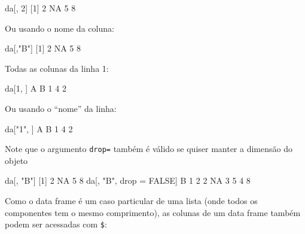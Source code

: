 \documentclass[
  10pt,
  a4paper]{book}
\newenvironment{Shaded}{\begin{snugshade}}{\end{snugshade}}
\newcommand{\ConstantTok}[1]{\textcolor[rgb]{0.00,0.00,0.00}{#1}}
\newcommand{\DecValTok}[1]{\textcolor[rgb]{0.00,0.00,0.81}{#1}}
\newcommand{\NormalTok}[1]{#1}
\newcommand{\OtherTok}[1]{\textcolor[rgb]{0.56,0.35,0.01}{#1}}
\newcommand{\StringTok}[1]{\textcolor[rgb]{0.31,0.60,0.02}{#1}}
\begin{document}
\begin{Shaded}
\begin{Highlighting}[]
\NormalTok{da[, }\DecValTok{2}\NormalTok{]}
\NormalTok{[}\DecValTok{1}\NormalTok{]  }\DecValTok{2} \ConstantTok{NA}  \DecValTok{5}  \DecValTok{8}
\end{Highlighting}
\end{Shaded}

Ou usando o nome da coluna:

\begin{Shaded}
\begin{Highlighting}[]
\NormalTok{da[,}\StringTok{"B"}\NormalTok{]}
\NormalTok{[}\DecValTok{1}\NormalTok{]  }\DecValTok{2} \ConstantTok{NA}  \DecValTok{5}  \DecValTok{8}
\end{Highlighting}
\end{Shaded}

Todas as colunas da linha 1:

\begin{Shaded}
\begin{Highlighting}[]
\NormalTok{da[}\DecValTok{1}\NormalTok{, ]}
\NormalTok{  A B}
\DecValTok{1} \DecValTok{4} \DecValTok{2}
\end{Highlighting}
\end{Shaded}

Ou usando o ``nome'' da linha:

\begin{Shaded}
\begin{Highlighting}[]
\NormalTok{da[}\StringTok{"1"}\NormalTok{, ]}
\NormalTok{  A B}
\DecValTok{1} \DecValTok{4} \DecValTok{2}
\end{Highlighting}
\end{Shaded}

Note que o argumento \texttt{drop=} também é válido se quiser manter a dimensão
do objeto

\begin{Shaded}
\begin{Highlighting}[]
\NormalTok{da[, }\StringTok{"B"}\NormalTok{]}
\NormalTok{[}\DecValTok{1}\NormalTok{]  }\DecValTok{2} \ConstantTok{NA}  \DecValTok{5}  \DecValTok{8}
\NormalTok{da[, }\StringTok{"B"}\NormalTok{, drop }\OtherTok{=} \ConstantTok{FALSE}\NormalTok{]}
\NormalTok{   B}
\DecValTok{1}  \DecValTok{2}
\DecValTok{2} \ConstantTok{NA}
\DecValTok{3}  \DecValTok{5}
\DecValTok{4}  \DecValTok{8}
\end{Highlighting}
\end{Shaded}

Como o data frame é um caso particular de uma lista (onde todos os
componentes tem o mesmo comprimento), as colunas de um data frame também
podem ser acessadas com \texttt{\$}:
\end{document}
